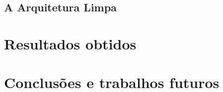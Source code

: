 \documentclass[12pt]{article}
\begin{document}


\subsection{A Arquitetura Limpa}




\section{Resultados obtidos}




\section{Conclusões e trabalhos futuros}






\end{document}
